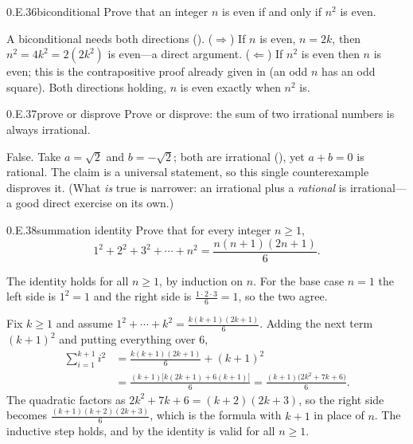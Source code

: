 \documentclass[main.tex]{subfiles}
\begin{document}
\begin{Exercise}{0.E.36}{biconditional}
Prove that an integer $n$ is even if and only if $n^2$ is even.
\end{Exercise}
\begin{Solution}
A biconditional needs both directions (). ($\Rightarrow$) If $n$ is even, $n=2k$, then
$n^2=4k^2=2(2k^2)$ is even---a direct argument. ($\Leftarrow$) If $n^2$ is even then $n$ is even; this
is the contrapositive proof already given in  (an odd $n$ has an odd square). Both
directions holding, $n$ is even exactly when $n^2$ is.
\end{Solution}

\begin{Exercise}{0.E.37}{prove or disprove}
Prove or disprove: the sum of two irrational numbers is always irrational.
\end{Exercise}
\begin{Solution}
False. Take $a=\sqrt2$ and $b=-\sqrt2$; both are irrational (), yet $a+b=0$ is rational.
The claim is a universal statement, so this single counterexample disproves it. (What \emph{is} true
is narrower: an irrational plus a \emph{rational} is irrational---a good direct exercise on its own.)
\end{Solution}
\par\bigskip{}\par\nobreak\smallskip

\begin{Exercise}{0.E.38}{summation identity}
Prove that for every integer $n\ge 1$,
\[
1^2+2^2+3^2+\cdots+n^2=\frac{n(n+1)(2n+1)}{6}.
\]
\end{Exercise}
\begin{Solution}
The identity holds for all $n\ge 1$, by induction on $n$. For the base case $n=1$ the left side is
$1^2=1$ and the right side is $\tfrac{1\cdot 2\cdot 3}{6}=1$, so the two agree.

Fix $k\ge 1$ and assume $1^2+\cdots+k^2=\tfrac{k(k+1)(2k+1)}{6}$. Adding the next term $(k+1)^2$ and
putting everything over $6$,
\[
\begin{aligned}
\sum_{i=1}^{k+1} i^2&=\frac{k(k+1)(2k+1)}{6}+(k+1)^2\\[2pt]
&=\frac{(k+1)\bigl[k(2k+1)+6(k+1)\bigr]}{6}
=\frac{(k+1)\bigl(2k^2+7k+6\bigr)}{6}.
\end{aligned}
\]
The quadratic factors as $2k^2+7k+6=(k+2)(2k+3)$, so the right side becomes
$\tfrac{(k+1)(k+2)(2k+3)}{6}$, which is the formula with $k+1$ in place of $n$. The inductive step
holds, and by  the identity is valid for all $n\ge 1$.
\end{Solution}
\end{document}
